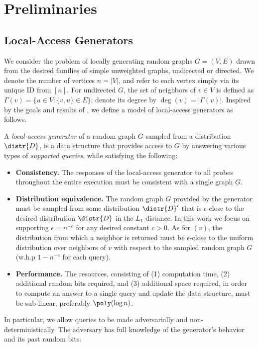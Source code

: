 \section{Preliminaries}
\label{sec:model}
\subsection{Local-Access Generators}
\label{sec:oracle_model}

We consider the problem of locally generating random graphs $G = (V,E)$ drawn from the desired families of simple unweighted graphs, undirected or directed. We denote the number of vertices $n = |V|$, and refer to each vertex simply via its unique ID from $[n]$. For undirected $G$, the set of neighbors of $v \in V$ is defined as $\Gamma(v) = \{u \in V: \{v,u\} \in E\}$; denote its degree by $\deg(v) = |\Gamma(v)|$.
Inspired by the goals and results of \cite{reut}, we define a model of local-access generators as follows.
\begin{definition}
A \emph{local-access generator} of a random graph $G$ sampled from a distribution $\distr{D}$,
is a data structure that provides access to $G$ by answering various types of
\emph{supported queries}, while satisfying the following:
\begin{itemize}
\item \textbf{Consistency.} The responses of the local-access generator to all probes throughout the entire execution must be consistent with a single graph $G$.
\item \textbf{Distribution equivalence.} 
The random graph $G$ provided by the generator must be sampled from some distribution $\distr{D}'$
that is $\epsilon$-close to the desired distribution $\distr{D}$ in the $L_1$-distance.
In this work we focus on supporting $\epsilon = n^{-c}$ for any desired constant $c>0$.
As for $(v)$, the distribution from which a neighbor is returned
must be $\epsilon$-close to the uniform distribution over neighbors of $v$
with respect to the sampled random graph $G$ (w.h.p $1-n^{-c}$ for each query).
\item \textbf{Performance.} The resources, consisting of (1) computation time, (2) additional random bits required, and (3) additional space required, in order to compute an answer to a single query and update the data structure, must be sub-linear, preferably $\poly(\log n)$.
\end{itemize}
\end{definition}
In particular, we allow queries to be made adversarially and non-deterministically. The adversary has full knowledge of the generator's behavior and its past random bits.

